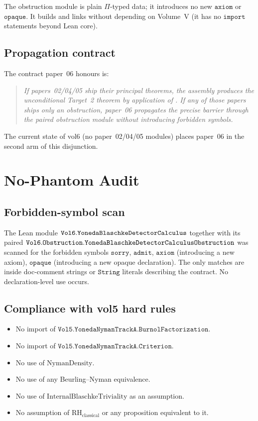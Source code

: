 \documentclass[12pt]{article}
\theoremstyle{plain}
\theoremstyle{definition}
\theoremstyle{remark}
\begin{document}
The obstruction module is plain \(\Pi\)-typed data; it introduces no
new \(\mathtt{axiom}\) or \(\mathtt{opaque}\). It builds and links
without depending on Volume~V (it has no \(\mathtt{import}\) statements
beyond Lean core).

\subsection{Propagation contract}

The contract paper~06 honours is:

\begin{quote}
\itshape
If papers~02/04/05 ship their principal theorems, the assembly produces
the unconditional Target~2 theorem by application of
. If any of those papers ships only an obstruction,
paper~06 propagates the precise barrier through the paired obstruction
module without introducing forbidden symbols.
\end{quote}

The current state of vol6 (no paper~02/04/05 modules) places paper~06
in the second arm of this disjunction.

\section{No-Phantom Audit}
\label{sec:audit}

\subsection{Forbidden-symbol scan}

The Lean module \(\mathtt{Vol6.Yoneda\-Blaschke\-Detector\-Calculus}\)
together with its paired
\(\mathtt{Vol6.Obstruction.Yoneda\-Blaschke\-Detector\-Calculus\-%
Obstruction}\) was scanned for the forbidden symbols
\(\mathtt{sorry}\), \(\mathtt{admit}\), \(\mathtt{axiom}\) (introducing
a new axiom), \(\mathtt{opaque}\) (introducing a new opaque
declaration). The only matches are inside doc-comment strings or
\(\mathtt{String}\) literals describing the contract. No
declaration-level use occurs.

\subsection{Compliance with vol5 hard rules}

\begin{itemize}
  \item No import of \(\mathtt{Vol5.YonedaNymanTrackA.BurnolFactorization}\).
  \item No import of \(\mathtt{Vol5.YonedaNymanTrackA.Criterion}\).
  \item No use of \(\mathrm{NymanDensity}\).
  \item No use of any Beurling--Nyman equivalence.
  \item No use of \(\mathrm{InternalBlaschkeTriviality}\) as an
        assumption.
  \item No assumption of \(\mathrm{RH}_{\mathrm{classical}}\) or any
        proposition equivalent to it.
\end{itemize}
\end{document}
